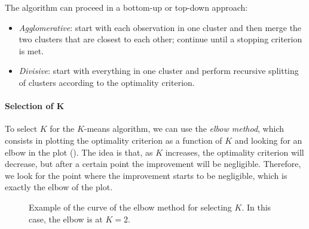 \begin{description}[beginpenalty=10000]
          The algorithm can proceed in a bottom-up or top-down approach:
          \begin{itemize}
              \item \emph{Agglomerative}: start with each observation in one cluster and then merge the two clusters that are closest to each other; continue until a stopping criterion is met.
              \item \emph{Divisive}: start with everything in one cluster and perform recursive splitting of clusters according to the optimality criterion.
          \end{itemize}
\end{description}

\paragraph{Selection of $\bm{K}$} To select $K$ for the $K$\negthinspace-means algorithm, we can use the \emph{elbow method}, which consists in plotting the optimality criterion as a function of $K$ and looking for an elbow in the plot (). The idea is that, as $K$ increases, the optimality criterion will decrease, but after a certain point the improvement will be negligible. Therefore, we look for the point where the improvement starts to be negligible, which is exactly the elbow of the plot.

\begin{figure}[tb]
    \centering
    \caption{Example of the curve of the elbow method for selecting $K$. In this case, the elbow is at $K = 2$.}
    \label{fig:elbow_method}
\end{figure}

